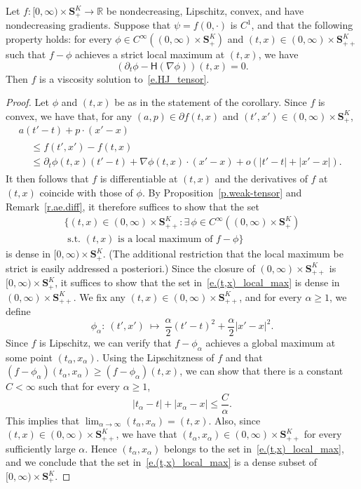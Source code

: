 \documentclass[10pt]{amsart}
\theoremstyle{definition}\newtheorem{defi}[theo]{Definition}\newtheorem{rema}[theo]{Remark}\newtheorem{exam}[theo]{Example}\newtheorem{exem}[theo]{Example}\newtheorem{nota}[theo]{Notation}
\newcommand{\R}{\mathbb{R}}
\renewcommand{\S}{\mathbf{S}}
\renewcommand{\H}{\mathsf{H}}
\renewcommand{\leq}{\leqslant}
\renewcommand{\geq}{\geqslant}
\newcommand{\Ll}{\left}
\newcommand{\Rr}{\right}
\let\oldexists\exists
\renewcommand*{\exists}{\mathrel{\oldexists}}
\begin{document}
\begin{coro}\label{c.vis}
Let $f : [0,\infty) \times \S^K_+ \to \R$ be nondecreasing, Lipschitz, convex, and have nondecreasing gradients. Suppose that $\psi=f(0,\cdot)$ is $C^1$, and that the following property holds: for every $\phi \in C^\infty((0,\infty)\times\S^K_+)$ and $(t,x) \in (0,\infty)\times\S^K_{++}$ such that $f-\phi$ achieves a strict local maximum at $(t,x)$, we have
\begin{equation*}
\Ll(\partial_t\phi-\H\Ll(\nabla\phi\Rr)\Rr)(t,x)=0.
\end{equation*}
Then $f$ is a viscosity solution to~\eqref{e.HJ_tensor}.
\end{coro}
\begin{proof}
Let $\phi$ and $(t,x)$ be as in the statement of the corollary. Since $f$ is convex, we have that, for any $(a,p)\in\partial f(t,x)$ and $(t',x')\in(0,\infty)\times\S^K_+$,
\begin{multline*}
a\Ll(t'-t\Rr)+p\cdot\Ll(x'-x\Rr)\\
\begin{aligned}
&\leq f\Ll(t',x'\Rr)-f(t,x)\\
&\leq\partial_t\phi(t,x)\Ll(t'-t\Rr)+\nabla \phi(t,x)\cdot \Ll(x'-x\Rr)+o\Ll(\Ll|t'-t\Rr|+\Ll|x'-x\Rr|\Rr).
\end{aligned}
\end{multline*}
It then follows that $f$ is differentiable at $(t,x)$ and the derivatives of $f$ at $(t,x)$ coincide with those of $\phi$. By Proposition~\ref{p.weak-tensor} {and Remark~\ref{r.ae.diff}}, it {therefore} suffices to show that the set
\begin{multline}\label{e.(t,x)_local_max}
\Big\{(t,x)\in(0,\infty)\times\S^K_{++}:\exists\, \phi\in C^\infty\Ll((0,\infty)\times \S^K_{+}\Rr)\\
\text{ s.t. }(t,x)\text{ is a local maximum of }f-\phi\Big\}
\end{multline}
is dense in $[0,\infty)\times \S^K_+$. (The additional restriction that the local maximum be strict is easily addressed a posteriori.) {Since the closure of $(0,\infty)\times \S^K_{++}$ is $[0,\infty)\times\S^K_+$, it suffices to show that the set in~\eqref{e.(t,x)_local_max} is dense in $(0,\infty)\times \S^K_{++}$.} We fix any $(t,x)\in (0,\infty)\times\S^K_{++}$, and for every $\alpha\geq 1$, we define
\[
\phi_\alpha:\ \Ll(t',x'\Rr)\ \mapsto \ \frac{\alpha}{2}\Ll(t'-t\Rr)^2+\frac{\alpha}{2}\Ll|x'-x\Rr|^2.
\]
Since $f$ is Lipschitz, we can verify that $f-\phi_\alpha$ achieves a global maximum at some point $(t_\alpha, x_\alpha)$. Using the Lipschitzness of $f$ and that $(f-\phi_\alpha)(t_\alpha,x_\alpha)\geq (f-\phi_\alpha)(t,x)$, we can show that there is a constant $C<\infty$ such that for every $\alpha\geq 1$,
\[
\Ll|t_\alpha-t\Rr|+\Ll|x_\alpha-x\Rr|\leq \frac{C}{\alpha}.
\]
This implies that $\lim_{\alpha\to\infty}(t_\alpha,x_\alpha)= (t,x)$. Also, since $(t,x)\in (0,\infty)\times\S^K_{++}$, we have that $(t_\alpha,x_\alpha)\in (0,\infty)\times\S^K_{++}$ for every sufficiently large $\alpha$. Hence $(t_\alpha,x_\alpha)$ belongs to the set in~\eqref{e.(t,x)_local_max}, and we conclude that the set in~\eqref{e.(t,x)_local_max} is a dense subset of $[0,\infty)\times \S^K_+$.
\end{proof}
\end{document}
